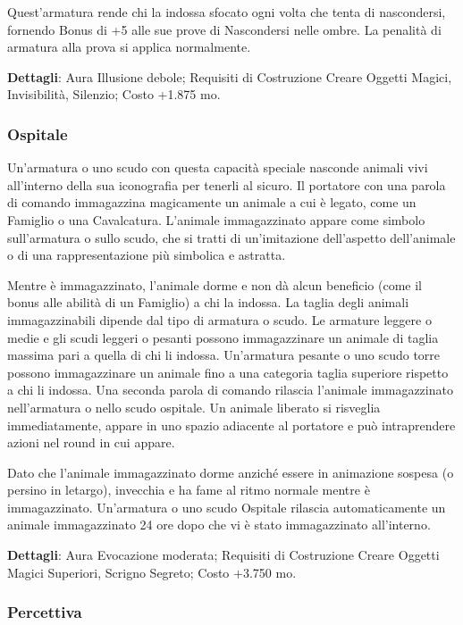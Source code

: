 \begin{multicols}{2}
Quest'armatura rende chi la indossa sfocato ogni volta che tenta di nascondersi, fornendo Bonus di +5 alle sue prove di Nascondersi nelle ombre. La penalità di armatura alla prova si applica normalmente.

\textbf{Dettagli}: Aura Illusione debole; Requisiti di Costruzione Creare Oggetti Magici, Invisibilità, Silenzio; Costo +1.875 mo.

\subsubsection{Ospitale}

Un'armatura o uno scudo con questa capacità speciale nasconde animali vivi all'interno della sua iconografia per tenerli al sicuro. Il portatore con una parola di comando immagazzina magicamente un animale a cui è legato, come un Famiglio o una Cavalcatura. L'animale immagazzinato appare come simbolo sull'armatura o sullo scudo, che si tratti di un'imitazione dell'aspetto dell'animale o di una rappresentazione più simbolica e astratta.

Mentre è immagazzinato, l'animale dorme e non dà alcun beneficio (come il bonus alle abilità di un Famiglio) a chi la indossa. La taglia degli animali immagazzinabili dipende dal tipo di armatura o scudo. Le armature leggere o medie e gli scudi leggeri o pesanti possono immagazzinare un animale di taglia massima pari a quella di chi li indossa. Un'armatura pesante o uno scudo torre possono immagazzinare un animale fino a una categoria taglia superiore rispetto a chi li indossa. Una seconda parola di comando rilascia l'animale immagazzinato nell'armatura o nello scudo ospitale. Un animale liberato si risveglia immediatamente, appare in uno spazio adiacente al portatore e può intraprendere azioni nel round in cui appare.

Dato che l'animale immagazzinato dorme anziché essere in animazione sospesa (o persino in letargo), invecchia e ha fame al ritmo normale mentre è immagazzinato. Un'armatura o uno scudo Ospitale rilascia automaticamente un animale immagazzinato 24 ore dopo che vi è stato immagazzinato all'interno.

\textbf{Dettagli}: Aura Evocazione moderata; Requisiti di Costruzione Creare Oggetti Magici Superiori, Scrigno Segreto; Costo +3.750 mo.


\subsubsection{Percettiva}


\end{multicols}
